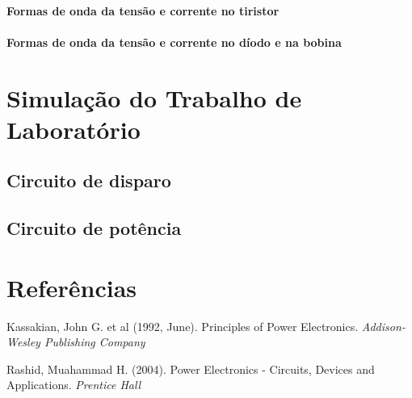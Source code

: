 \documentclass[a4paper,11pt]{article}
\numberwithin{equation}{section}
\begin{document}

\paragraph{Formas de onda da tensão e corrente no tiristor}


\paragraph{Formas de onda da tensão e corrente no díodo e na bobina}


\section{Simulação do Trabalho de Laboratório}


\subsection{Circuito de disparo}

\subsection{Circuito de potência}

\section{Referências}

Kassakian, John G. et al (1992, June). Principles of Power Electronics. \textit{Addison-Wesley Publishing Company}

Rashid, Muahammad H. (2004). Power Electronics - Circuits, Devices and Applications. \textit{Prentice Hall}

\pagebreak
\end{document}
